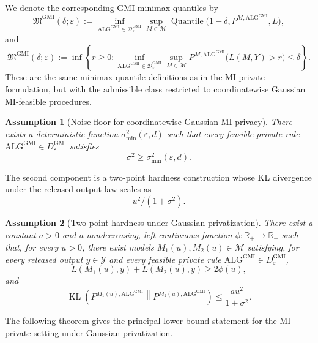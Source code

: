 \documentclass[journal]{IEEEtran}
\newtheorem{assumption}{Assumption}
\newcommand{\ALG}{\mathrm{ALG}}
\newcommand{\KL}{\operatorname{KL}}
\begin{document}
We denote the corresponding GMI minimax quantiles by
\[
\mathfrak M^{\mathrm{GMI}}(\delta;\varepsilon)
:=
\inf_{\ALG^{\mathrm{GMI}}\in\mathcal D_\varepsilon^{\mathrm{GMI}}}
\sup_{M\in\mathcal M}
\operatorname{Quantile}
\bigl(1-\delta,P^{M,\ALG^{\mathrm{GMI}}},L\bigr),
\]
and
\[
\mathfrak M^{\mathrm{GMI}}_-(\delta;\varepsilon)
:=
\inf\left\{
r\ge0:
\inf_{\ALG^{\mathrm{GMI}}\in\mathcal D_\varepsilon^{\mathrm{GMI}}}
\sup_{M\in\mathcal M}
P^{M,\ALG^{\mathrm{GMI}}}
\bigl(L(M,Y)>r\bigr)
\le \delta
\right\}.
\]
These are the same minimax-quantile definitions as in the 
MI-private formulation, but with the admissible class restricted 
to coordinatewise Gaussian MI-feasible procedures.


\begin{assumption}[Noise floor for coordinatewise Gaussian MI privacy]
\label{ass:noise-floor}
There exists a deterministic function \(\sigma_{\min}^2(\varepsilon,d)\) such
that every feasible private rule \(\ALG^{\mathrm{GMI}} \in D_\varepsilon^{\mathrm{GMI}}\)
satisfies
\[
\sigma^2\ge \sigma_{\min}^2(\varepsilon,d).
\]
\end{assumption}

The second component is a two-point hardness construction whose KL divergence
under the released-output law scales as \[
u^2/(1+\sigma^2).\]




\begin{assumption}[Two-point hardness under Gaussian privatization]
\label{ass:two-point-gaussian}
There exist a constant \(a>0\) and a nondecreasing, left-continuous function
\(\phi:\mathbb R_+\to\mathbb R_+\) such that, for every \(u>0\), there exist
models \(M_1(u),M_2(u)\in\mathcal M\) satisfying, for every released output
\(y\in\mathcal Y\) and every feasible private rule
\(\ALG^{\mathrm{GMI}} \in D_\varepsilon^{\mathrm{GMI}}\),
\[
L(M_1(u),y)+L(M_2(u),y)\ge 2\phi(u),
\]
and
\[
\KL\!\left(
P^{M_1(u),\ALG^{\mathrm{GMI}}}\middle\|P^{M_2(u),\ALG^{\mathrm{GMI}}}
\right)
\le
\frac{a u^2}{1+\sigma^2}.
\]
\end{assumption}

The following theorem gives the principal lower-bound statement for the
MI-private setting under Gaussian privatization.
\end{document}
